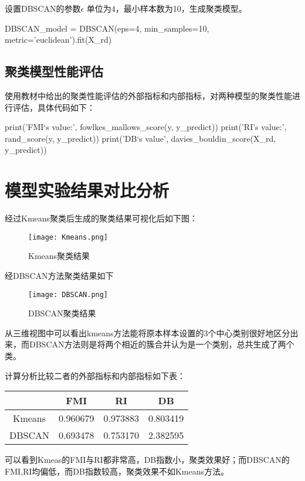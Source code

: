 \documentclass{ctexart}
\begin{document}
设置DBSCAN的参数$\epsilon$ 单位为4，最小样本数为10，生成聚类模型。
\begin{python}
DBSCAN_model = DBSCAN(eps=4, min_samples=10, metric='euclidean').fit(X_rd)
\end{python}

\subsection{聚类模型性能评估}
使用教材中给出的聚类性能评估的外部指标和内部指标，对两种模型的聚类性能进行评估，具体代码如下：
\begin{python}
print('FMI‘s value:', fowlkes_mallows_score(y, y_predict))
print('RI’s value:', rand_score(y, y_predict))
print('DB‘s value', davies_bouldin_score(X_rd, y_predict))
\end{python}
\vfill
\section{模型实验结果对比分析}
经过Kmeans聚类后生成的聚类结果可视化后如下图：

\begin{figure}[H]
\texttt{[image: Kmeans.png]}
\caption{Kmeans聚类结果}
\end{figure}
\vfill
经DBSCAN方法聚类结果如下
\begin{figure}[H]
\texttt{[image: DBSCAN.png]}
\caption{DBSCAN聚类结果}
\end{figure}

从三维视图中可以看出kmeans方法能将原本样本设置的3个中心类别很好地区分出来，而DBSCAN方法则是将两个相近的簇合并认为是一个类别，总共生成了两个类。

计算分析比较二者的外部指标和内部指标如下表：

\begin{table}[H]
	\centering
	\begin{tabular}{c|ccc}
	\toprule[1.2pt]
	&FMI&RI&DB\\
	\midrule
	Kmeans&0.960679&0.973883&0.803419\\
	\midrule
	DBSCAN&0.693478&0.753170&2.382595\\
	\bottomrule[1.2pt]
	\end{tabular}
\end{table}

可以看到Kmeas的FMI与RI都非常高，DB指数小，聚类效果好；而DBSCAN的FMI,RI均偏低，而DB指数较高，聚类效果不如Kmeans方法。
\end{document}

